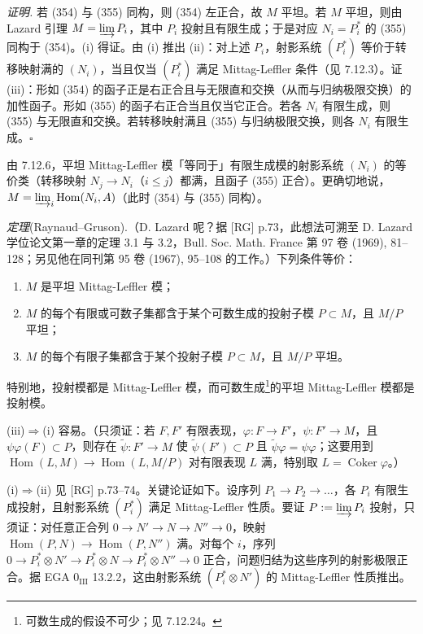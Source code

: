 \emph{证明.} 若 (354) 与 (355) 同构，则 (354) 左正合，故 $M$ 平坦。若 $M$ 平坦，则由 Lazard 引理 $M=\varinjlim P_i$，其中 $P_i$ 投射且有限生成；于是对应 $N_i=P^{*}_i$ 的 (355) 同构于 (354)。(i) 得证。由 (i) 推出 (ii)：对上述 $P_i$，射影系统 $(P^{*}_i)$ 等价于转移映射满的 $(N_i)$，当且仅当 $(P^{*}_i)$ 满足 Mittag-Leffler 条件（见 7.12.3）。证 (iii)：形如 (354) 的函子正是右正合且与无限直和交换（从而与归纳极限交换）的加性函子。形如 (355) 的函子右正合当且仅当它正合。若各 $N_i$ 有限生成，则 (355) 与无限直和交换。若转移映射满且 (355) 与归纳极限交换，则各 $N_i$ 有限生成。\hfill$\square$

 由 7.12.6，平坦 Mittag-Leffler 模「等同于」有限生成模的射影系统 $(N_i)$ 的等价类（转移映射 $N_j\to N_i$（$i\le j$）都满，且函子 (355) 正合）。更确切地说，$M=\varinjlim_i\operatorname{Hom}(N_i,A)$（此时 (354) 与 (355) 同构）。

 \emph{定理}(Raynaud--Gruson).（D. Lazard 呢？据 [RG] p.73，此想法可溯至 D. Lazard 学位论文第一章的定理 3.1 与 3.2，Bull. Soc. Math. France 第 97 卷 (1969), 81--128；另见他在同刊第 95 卷 (1967), 95--108 的工作。）下列条件等价：
\begin{enumerate}[label=(\roman*),leftmargin=2.2em]
\item $M$ 是平坦 Mittag-Leffler 模；
%
\item $M$ 的每个有限或可数子集都含于某个可数生成的投射子模 $P\subset M$，且 $M/P$ 平坦；
\item $M$ 的每个有限子集都含于某个投射子模 $P\subset M$，且 $M/P$ 平坦。
\end{enumerate}

特别地，投射模都是 Mittag-Leffler 模，而可数生成\footnote{可数生成的假设不可少；见 7.12.24。}的平坦 Mittag-Leffler 模都是投射模。

(iii)$\Rightarrow$(i) 容易。（只须证：若 $F,F'$ 有限表现，$\varphi:F\to F'$，$\psi:F'\to M$，且 $\psi\varphi(F)\subset P$，则存在 $\tilde\psi:F'\to M$ 使 $\tilde\psi(F')\subset P$ 且 $\tilde\psi\varphi=\psi\varphi$；这要用到 $\operatorname{Hom}(L,M)\to\operatorname{Hom}(L,M/P)$ 对有限表现 $L$ 满，特别取 $L=\operatorname{Coker}\varphi$。）

(i)$\Rightarrow$(ii) 见 [RG] p.73--74。关键论证如下。设序列 $P_1\to P_2\to\ldots$，各 $P_i$ 有限生成投射，且射影系统 $(P^{*}_i)$ 满足 Mittag-Leffler 性质。要证 $P:=\varinjlim P_i$ 投射，只须证：对任意正合列 $0\to N'\to N\to N''\to 0$，映射 $\operatorname{Hom}(P,N)\to\operatorname{Hom}(P,N'')$ 满。对每个 $i$，序列 $0\to P^{*}_i\otimes N'\to P^{*}_i\otimes N\to P^{*}_i\otimes N''\to 0$ 正合，问题归结为这些序列的射影极限正合。据 EGA $0_{\mathrm{III}}$ 13.2.2，这由射影系统 $(P^{*}_i\otimes N')$ 的 Mittag-Leffler 性质推出。

